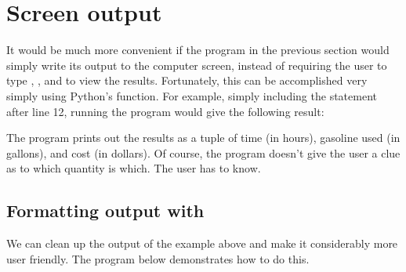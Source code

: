 \documentclass[letterpaper,10pt,english]{sphinxmanual}
\begin{document}
\ignorespaces 

\section{Screen output}
\label{\detokenize{chap4/chap4_io:screen-output}}\label{\detokenize{chap4/chap4_io:screenoutput}}\label{\detokenize{chap4/chap4_io:index-2}}
\sphinxAtStartPar
It would be much more convenient if the program in the previous section would simply write its output to the computer screen, instead of requiring the user to type , , and  to view the results.  Fortunately, this can be accomplished very simply using Python’s  function.  For example, simply including the statement  after line 12, running the program would give the following result:

\begin{sphinxVerbatim}[commandchars=\\\{\}]
 

\end{sphinxVerbatim}

\sphinxAtStartPar
The program prints out the results as a tuple of time (in hours), gasoline used (in gallons), and cost (in dollars).  Of course, the program doesn’t give the user a clue as to which quantity is which.  The user has to know.


\subsection{Formatting output with }
\label{\detokenize{chap4/chap4_io:formatting-output-with-str-format}}
\sphinxAtStartPar
We can clean up the output of the example above and make it considerably more user friendly.  The program below demonstrates how to do this.
\end{document}
